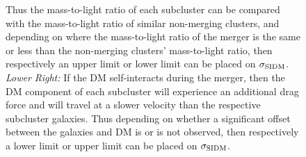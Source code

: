 \begin{figure}
{Thus the mass-to-light ratio of each subcluster can be compared with the mass-to-light ratio of similar non-merging clusters, and depending on where the mass-to-light ratio of the merger is the same or less than the non-merging clusters' mass-to-light ratio, then respectively an upper limit or lower limit can be placed on $\sigma_{\rm SIDM}$.
\emph{Lower Right:} If the DM self-interacts during the merger, then the DM component of each subcluster will experience an additional drag force and will travel at a slower velocity than the respective subcluster galaxies.
Thus depending on whether a significant offset between the galaxies and DM is or is not observed, then respectively a lower limit or upper limit can be placed on $\sigma_{\rm SIDM}$.
\label{fig:4ConstraintMethods}}
\end{figure}  